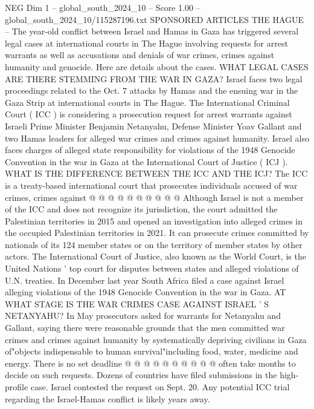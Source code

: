 \begin{textsample}{NEG Dim 1 – global\_south\_2024\_10 – Score 1.00 – global\_south\_2024\_10/115287196.txt}  \label{ex:f1_neg_428}
SPONSORED ARTICLES THE HAGUE -- The year-old conflict between Israel and Hamas in Gaza has triggered several legal cases at international courts in The Hague involving requests for arrest warrants as well as accusations and denials of war crimes, crimes against humanity and genocide.
Here are details about the cases.
WHAT LEGAL CASES ARE THERE STEMMING FROM THE WAR IN GAZA?
Israel faces two legal proceedings related to the Oct. 7 attacks by Hamas and the ensuing war in the Gaza Strip at international courts in The Hague.
The International Criminal Court ( ICC ) is considering a prosecution request for arrest warrants against Israeli Prime Minister Benjamin Netanyahu, Defense Minister Yoav Gallant and two Hamas leaders for alleged war crimes and crimes against humanity.
Israel also faces charges of alleged state responsibility for violations of the 1948 Genocide Convention in the war in Gaza at the International Court of Justice ( ICJ ).
WHAT IS THE DIFFERENCE BETWEEN THE ICC AND THE ICJ?
The ICC is a treaty-based international court that prosecutes individuals accused of war crimes, crimes against @ @ @ @ @ @ @ @ @ @ Although Israel is not a member of the ICC and does not recognize its jurisdiction, the court admitted the Palestinian territories in 2015 and opened an investigation into alleged crimes in the occupied Palestinian territories in 2021.
It can prosecute crimes committed by nationals of its 124 member states or on the territory of member states by other actors.
The International Court of Justice, also known as the World Court, is the United Nations ' top court for disputes between states and alleged violations of U.N. treaties.
In December last year South Africa filed a case against Israel alleging violations of the 1948 Genocide Convention in the war in Gaza.
AT WHAT STAGE IS THE WAR CRIMES CASE AGAINST ISRAEL ' S NETANYAHU?
In May prosecutors asked for warrants for Netanyahu and Gallant, saying there were reasonable grounds that the men committed war crimes and crimes against humanity by systematically depriving civilians in Gaza of"objects indispensable to human survival"including food, water, medicine and energy.
There is no set deadline @ @ @ @ @ @ @ @ @ @ often take months to decide on such requests.
Dozens of countries have filed submissions in the high-profile case.
Israel contested the request on Sept. 20.
Any potential ICC trial regarding the Israel-Hamas conflict is likely years away.

\end{textsample}
